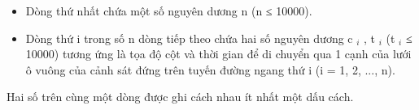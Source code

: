 \begin{itemize}
	\item Dòng thứ nhất chứa một số nguyên dương n (n ≤ 10000).
	\item Dòng thứ i trong số n dòng tiếp theo chứa hai số nguyên dương c $_ i $ , t $_ i $ (t $_ i $ ≤ 10000) tương ứng là tọa độ cột và thời gian để di chuyển qua 1 cạnh của lưới ô vuông của cảnh sát đứng trên tuyến đường ngang thứ i (i = 1, 2, ..., n).
\end{itemize}

Hai số trên cùng một dòng được ghi cách nhau ít nhất một dấu cách.

\